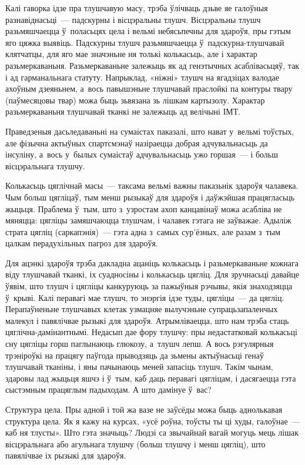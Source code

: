 Калі гаворка ідзе пра тлушчавую масу, трэба ўлічваць дзьве яе галоўныя разнавіднасьці~--- падскурны і вісцэральны тлушч. Вісцэральны тлушч разьмяшчаецца ў~поласьцях цела і вельмі небясьпечны для здароўя, пры гэтым яго цяжка выявіць. Падскурны тлушч разьмяшчаецца ў~падскурна-тлушчавай клятчатцы, для яго мае значэньне ня толькі колькасьць, але і характар разьмеркаваньня. Разьмеркаваньне залежыць як ад генэтычных асаблівасьцяў, так і ад гарманальнага статуту. Напрыклад, «ніжні» тлушч на ягадзіцах валодае ахоўным дзеяньнем, а~вось павышэньне тлушчавай праслойкі па контуры твару (паўмесяцовы твар) можа быць зьвязана зь лішкам картызолу. Характар разьмеркаваньня тлушчавай тканкі не залежыць ад велічыні ІМТ.

Праведзеныя дасьледаваньні на сумаістах паказалі, што нават у~вельмі тоўстых, але фізычна актыўных спартсмэнаў назіраецца добрая адчувальнасьць да інсуліну, а~вось у~былых сумаістаў адчувальнасьць ужо горшая~--- і больш вісцэральнага тлушчу.

Колькасьць цяглічнай масы~--- таксама вельмі важны паказьнік здароўя чалавека. Чым больш цягліцаў, тым менш рызыкаў для здароўя і даўжэйшая працягласьць жыцьця. Праблема ў~тым, што з~узростам ахоп канцавінаў можа асабліва не мяняцца: цягліцы замяшчаюцца тлушчам, і чалавек гэтага не заўважае. Адыліж страта цягліц (саркапэнія)~--- гэта адна з~самых сур'ёзных, але разам з~тым цалкам перадухільных пагроз для здароўя.

Для ацэнкі здароўя трэба дакладна ацаніць колькасьць і разьмеркаваньне кожнага віду тлушчавай тканкі, іх суадносіны і колькасьць цягліц. Для зручнасьці давайце ўявім, што тлушч і цягліцы канкуруюць за пажыўныя рэчывы, якія знаходзяцца ў~крыві. Калі перавагі мае тлушч, то энэргія ідзе туды, цягліцы~--- да цягліц. Перапаўненьне тлушчавых клетак узмацняе вылучэньне супрацьзапаленчых малекул і павялічвае рызыкі для здароўя. Атрымліваецца, што нам трэба стаць цяглічна-дамінантнымі. Недасып дае фору тлушчу: пры недастатковай колькасьці сну цягліцы горш паглынаюць глюкозу, а~тлушч лепш. А вось рэгулярныя трэніроўкі на працягу паўгода прыводзяць да зьмены актыўнасьці генаў тлушчавай тканіны, і яны пачынаюць меней запасіць тлушч. Такім чынам, здаровы лад жыцьця яшчэ і ў~тым, каб даць перавагі цягліцам, і дасягаецца гэта сыстэмным працяглым падыходам. А што дамінуе ў~вас?

Структура цела. Пры адной і той жа вазе не заўсёды можа быць аднолькавая структура цела. Як я кажу на курсах, «усё роўна, тоўсты ты ці худы, галоўнае~--- каб ня тлусты». Што гэта значыць? Людзі са звычайнай вагай могуць мець лішак вісцэральнага або агульнага тлушчу (больш тлушчу і менш цягліц), што павялічвае іх рызыкі для здароўя.

